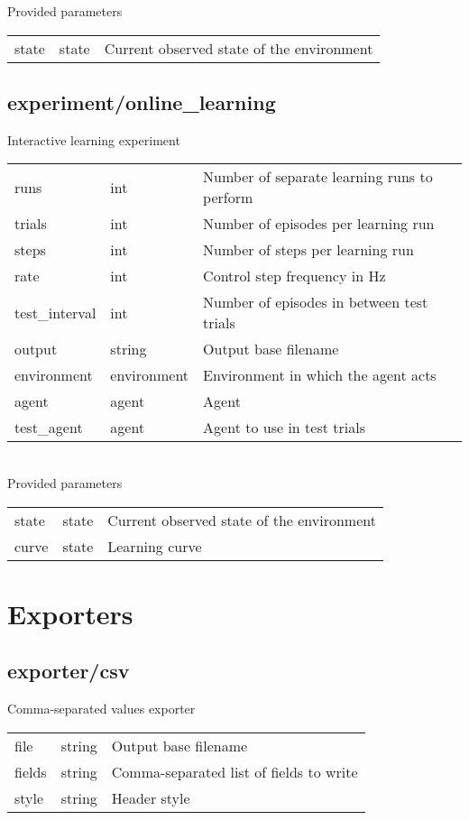 \noindent Provided parameters\\

\noindent\begin{tabular}{@{}lll@{}}
state&state&Current observed state of the environment\\
\end{tabular}
\subsection{experiment/online\_learning}
\noindent Interactive learning experiment\\

\noindent\begin{tabular}{@{}lll@{}}
runs&int&Number of separate learning runs to perform\\
trials&int&Number of episodes per learning run\\
steps&int&Number of steps per learning run\\
rate&int&Control step frequency in Hz\\
test\_interval&int&Number of episodes in between test trials\\
output&string&Output base filename\\
environment&environment&Environment in which the agent acts\\
agent&agent&Agent\\
test\_agent&agent&Agent to use in test trials\\
\end{tabular}
\\

\noindent Provided parameters\\

\noindent\begin{tabular}{@{}lll@{}}
state&state&Current observed state of the environment\\
curve&state&Learning curve\\
\end{tabular}
\section{Exporters}
\subsection{exporter/csv}
\noindent Comma-separated values exporter\\

\noindent\begin{tabular}{@{}lll@{}}
file&string&Output base filename\\
fields&string&Comma-separated list of fields to write\\
style&string&Header style\\
\end{tabular}
